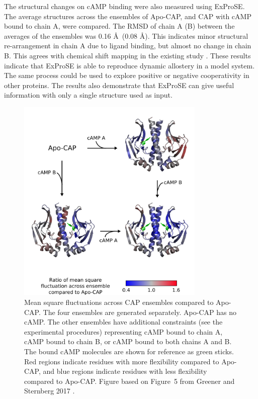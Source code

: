 The structural changes on cAMP binding were also measured using ExProSE.
The average structures across the ensembles of Apo-CAP, and CAP with cAMP bound to chain A, were compared.
The RMSD of chain A (B) between the averages of the ensembles was 0.16 \AA\ (0.08 \AA).
This indicates minor structural re-arrangement in chain A due to ligand binding, but almost no change in chain B.
This agrees with chemical shift mapping in the existing study \cite{Popovych2006}.
These results indicate that ExProSE is able to reproduce dynamic allostery in a model system.
The same process could be used to explore positive or negative cooperativity in other proteins.
The results also demonstrate that ExProSE can give useful information with only a single structure used as input.


\begin{figure}
\centering

\includegraphics[width=0.8\textwidth]{figures/cap/cap}

\caption{Mean square fluctuations across CAP ensembles compared to Apo-CAP.
The four ensembles are generated separately.
Apo-CAP has no cAMP.
The other ensembles have additional constraints (see the experimental procedures) representing cAMP bound to chain A, cAMP bound to chain B, or cAMP bound to both chains A and B.
The bound cAMP molecules are shown for reference as green sticks.
Red regions indicate residues with more flexibility compared to Apo-CAP, and blue regions indicate residues with less flexibility compared to Apo-CAP.
Figure based on Figure~5 from Greener and Sternberg 2017 \cite{Greener2017}.}

\label{fig:cap}
\end{figure}


